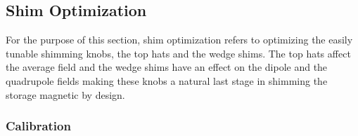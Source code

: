 
\subsection{Shim Optimization}

For the purpose of this section, shim optimization refers to optimizing the easily tunable shimming knobs, the top hats and the wedge shims. The top hats affect the average field and the wedge shims have an effect on the dipole and the quadrupole fields making these knobs a natural last stage in shimming the storage magnetic by design.

\subsubsection{Calibration}

